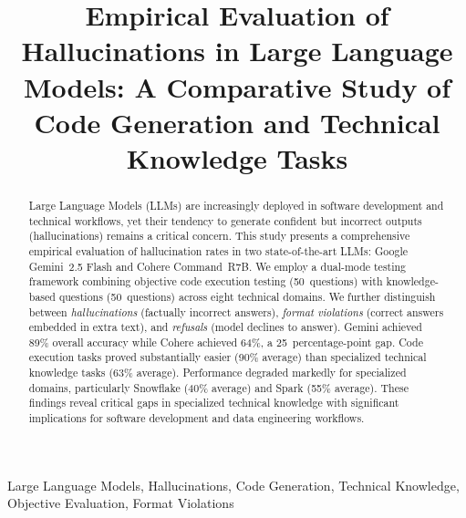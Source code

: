 \documentclass[conference]{IEEEtran}
\begin{document}
\title{Empirical Evaluation of Hallucinations in Large Language Models: A Comparative Study of Code Generation and Technical Knowledge Tasks}

\author{
}

\maketitle

\begin{abstract}
Large Language Models (LLMs) are increasingly deployed in software development and technical workflows, yet their tendency to generate confident but incorrect outputs (hallucinations) remains a critical concern. This study presents a comprehensive empirical evaluation of hallucination rates in two state-of-the-art LLMs: Google Gemini~2.5 Flash and Cohere Command~R7B. We employ a dual-mode testing framework combining objective code execution testing (50~questions) with knowledge-based questions (50~questions) across eight technical domains. We further distinguish between \emph{hallucinations} (factually incorrect answers), \emph{format violations} (correct answers embedded in extra text), and \emph{refusals} (model declines to answer). Gemini achieved 89\% overall accuracy while Cohere achieved 64\%, a 25~percentage-point gap. Code execution tasks proved substantially easier (90\% average) than specialized technical knowledge tasks (63\% average). Performance degraded markedly for specialized domains, particularly Snowflake (40\% average) and Spark (55\% average). These findings reveal critical gaps in specialized technical knowledge with significant implications for software development and data engineering workflows.
\end{abstract}

\begin{IEEEkeywords}
Large Language Models, Hallucinations, Code Generation, Technical Knowledge, Objective Evaluation, Format Violations
\end{IEEEkeywords}

\end{document}
